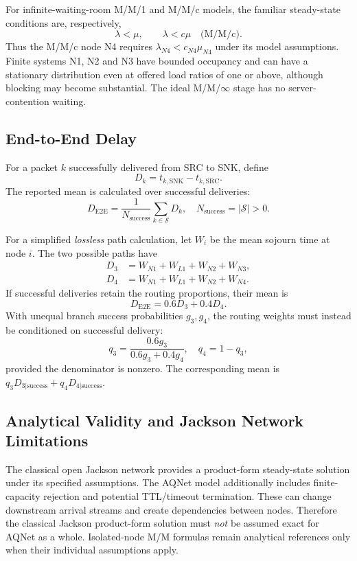 For infinite-waiting-room M/M/1 and M/M/c models, the familiar
steady-state conditions are, respectively,
\begin{equation}
\lambda<\mu,
\qquad\lambda<c\mu\quad\text{(M/M/c)}.
\label{eq:b2_stability}
\end{equation}
Thus the M/M/c node N4 requires
$\lambda_{N4}<c_{N4}\mu_{N4}$ under its model assumptions. Finite
systems N1, N2 and N3 have bounded occupancy and can have a
stationary distribution even at offered load ratios of one or above,
although blocking may become substantial. The ideal M/M/$\infty$
stage has no server-contention waiting.

\subsection{End-to-End Delay}
For a packet $k$ successfully delivered from SRC to SNK, define
\begin{equation}
D_k=t_{k,\mathrm{SNK}}-t_{k,\mathrm{SRC}}.
\label{eq:b2_packet_delay}
\end{equation}
The reported mean is calculated over successful deliveries:
\begin{equation}
D_{\mathrm{E2E}}=\frac{1}{N_{\mathrm{success}}}
\sum_{k\in\mathcal{S}}D_k,\quad
N_{\mathrm{success}}=|\mathcal{S}|>0.
\label{eq:b2_mean_delay}
\end{equation}

For a simplified \emph{lossless} path calculation, let $W_i$ be the
mean sojourn time at node $i$. The two possible paths have
\begin{align}
D_3&=W_{N1}+W_{L1}+W_{N2}+W_{N3},\\
D_4&=W_{N1}+W_{L1}+W_{N2}+W_{N4}.
\end{align}
If successful deliveries retain the routing proportions, their mean is
\begin{equation}
D_{\mathrm{E2E}}=0.6D_3+0.4D_4.
\label{eq:b2_path_mean}
\end{equation}
With unequal branch success probabilities $g_3,g_4$, the routing
weights must instead be conditioned on successful delivery:
\begin{equation}
q_3=\frac{0.6g_3}{0.6g_3+0.4g_4},\quad q_4=1-q_3,
\label{eq:b2_conditional_weights}
\end{equation}
provided the denominator is nonzero. The corresponding mean is
$q_3D_{3|\mathrm{success}}+q_4D_{4|\mathrm{success}}$.

\subsection{Analytical Validity and Jackson Network Limitations}
The classical open Jackson network provides a product-form
steady-state solution under its specified assumptions. The AQNet model additionally includes finite-capacity rejection and
potential TTL/timeout termination. These can change downstream arrival
streams and create dependencies between nodes. Therefore the classical
Jackson product-form solution must \emph{not} be assumed exact for
AQNet as a whole. Isolated-node M/M formulas remain analytical
references only when their individual assumptions apply.

